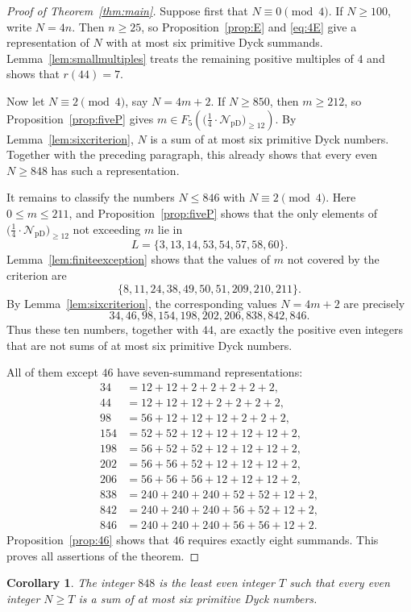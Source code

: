 \documentclass[12pt]{article}
\theoremstyle{plain}
\newtheorem{corollary}[theorem]{Corollary}
\newcommand{\Pset}{\bigl(\tfrac14\cdot
  \mathcal N_{\mathrm{pD}}\bigr)_{\ge 12}}
\begin{document}
\begin{proof}[Proof of Theorem~\ref{thm:main}]
Suppose first that $N\equiv0\pmod 4$.  If $N\geq100$, write $N=4n$.
Then $n\geq25$, so Proposition~\ref{prop:E} and \eqref{eq:4E} give a
representation of $N$ with at most six primitive Dyck summands.
Lemma~\ref{lem:smallmultiples} treats the remaining positive multiples
of $4$ and shows that $r(44)=7$.

Now let $N\equiv2\pmod 4$, say $N=4m+2$.  If $N\geq850$, then $m\geq212$,
so Proposition~\ref{prop:fiveP} gives $m\in F_5(\Pset)$.  By
Lemma~\ref{lem:sixcriterion}, $N$ is a sum of at most six primitive
Dyck numbers.  Together with the preceding paragraph, this already
shows that every even $N\geq848$ has such a representation.

It remains to classify the numbers $N\leq846$ with $N\equiv2\pmod 4$.
Here $0\leq m\leq211$, and Proposition~\ref{prop:fiveP} shows that the
only elements of $\Pset$ not exceeding $m$ lie in
\[
 L=\{3,13,14,53,54,57,58,60\}.
\]
Lemma~\ref{lem:finiteexception} shows that the values of $m$ not
covered by the criterion are
\[
 \{8,11,24,38,49,50,51,209,210,211\}.
\]
By Lemma~\ref{lem:sixcriterion}, the corresponding values $N=4m+2$
are precisely
\[
 34,46,98,154,198,202,206,838,842,846.
\]
Thus these ten numbers, together with $44$, are exactly the positive
even integers that are not sums of at most six primitive Dyck numbers.

All of them except $46$ have seven-summand representations:
\[
\begin{aligned}
34&=12+12+2+2+2+2+2,\\
44&=12+12+12+2+2+2+2,\\
98&=56+12+12+12+2+2+2,\\
154&=52+52+12+12+12+12+2,\\
198&=56+52+52+12+12+12+2,\\
202&=56+56+52+12+12+12+2,\\
206&=56+56+56+12+12+12+2,\\
838&=240+240+240+52+52+12+2,\\
842&=240+240+240+56+52+12+2,\\
846&=240+240+240+56+56+12+2.
\end{aligned}
\]
Proposition~\ref{prop:46} shows that $46$ requires exactly eight
summands.  This proves all assertions of the theorem.
\end{proof}

\begin{corollary}\label{cor:threshold}
The integer $848$ is the least even integer $T$ such that every even
integer $N\geq T$ is a sum of at most six primitive Dyck numbers.
\end{corollary}
\end{document}
